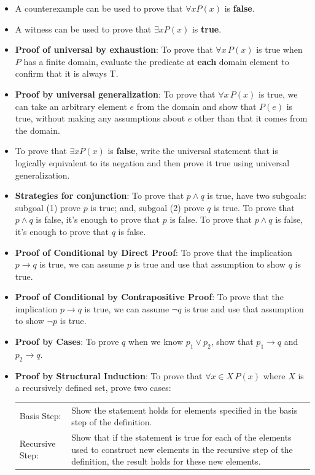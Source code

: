 \documentclass[12pt, oneside]{article}
\begin{document}
\begin{itemize}
    \item A counterexample can be used to prove that  $\forall x P(x)$ is {\bf false}.
    \item  A witness can be used  to  prove that  $\exists x P(x)$ is {\bf true}.
    \item {\bf Proof of universal by exhaustion}: To prove that $\forall x \, P(x)$
is true when $P$ has a finite domain, evaluate the predicate at {\bf each} domain element to confirm that it is always T.
    \item  {\bf Proof by universal generalization}: To prove that $\forall x \, P(x)$
is true, we can take an arbitrary element $e$ from the domain and show that $P(e)$ is true, without making any assumptions about $e$ other than that it comes from the domain.
    \item To  prove  that $\exists x P(x)$ is {\bf false}, write the universal statement that is logically equivalent to its negation and then prove it true using universal generalization.
    
\newpage
    \item {\bf Strategies for conjunction}: To prove that $p \land q$ is true, have two subgoals: subgoal (1) prove $p$ 
is  true; and, subgoal (2) prove $q$ is true. To prove that $p \land q$ is false, it's enough to prove that $p$ is false.
 To prove that $p \land q$ is false, it's enough to prove that $q$ is false.
    \item {\bf Proof of Conditional by Direct Proof}: To prove that the implication $p \to q$ is true, we can assume $p$ is true and use that assumption to show $q$ is true.
    \item {\bf Proof of Conditional by Contrapositive Proof}: To prove that the implication $p \to q$ is true, we can assume $\neg q$ is true and use that assumption to show $\neg p$ is true.
    \item {\bf Proof by Cases}: To prove $q$ when we know $p_1 \lor p_2$, show that $p_1 \to q$ and $p_2 \to q$.
    \item  
    {\bf Proof by Structural Induction}: To prove that $\forall x \in X \, P(x)$ where $X$ is a recursively defined set, prove two cases:
        
        \begin{tabularx}{\textwidth}{l X}
        Basis Step: & Show the statement holds for elements specified in the basis step of the definition. \\
        Recursive Step: & Show that if the statement is true for each of the elements used to construct
    new elements in the recursive step of the definition, the result holds for these new elements.
    \end{tabularx}
    

\end{itemize}
\end{document}
